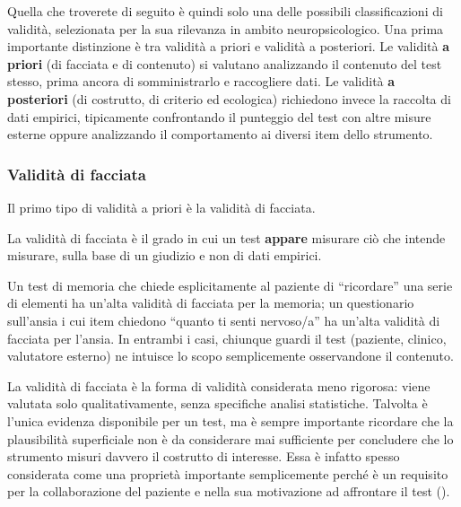 \documentclass[
  italian,
  letterpaper,
  paper=A4,
  headinclude=on,
  footinclude=on,
  12pt]{scrbook}
\begin{document}
Quella che troverete di seguito è quindi solo una delle possibili
classificazioni di validità, selezionata per la sua rilevanza in ambito
neuropsicologico. Una prima importante distinzione è tra validità a
priori e validità a posteriori. Le validità \textbf{a priori} (di
facciata e di contenuto) si valutano analizzando il contenuto del test
stesso, prima ancora di somministrarlo e raccogliere dati. Le validità
\textbf{a posteriori} (di costrutto, di criterio ed ecologica)
richiedono invece la raccolta di dati empirici, tipicamente confrontando
il punteggio del test con altre misure esterne oppure analizzando il
comportamento ai diversi item dello strumento.

\subsubsection{Validità di facciata}\label{validituxe0-di-facciata}

Il primo tipo di validità a priori è la validità di facciata.

\begin{tcolorbox}[enhanced jigsaw, left=2mm, colbacktitle=quarto-callout-note-color!10!white, bottomrule=.15mm, opacityback=0, coltitle=black, colframe=quarto-callout-note-color-frame, opacitybacktitle=0.6, leftrule=.75mm, colback=white, toprule=.15mm, title=\textcolor{quarto-callout-note-color}{\faInfo}\hspace{0.5em}{Definizione}, titlerule=0mm, arc=.35mm, breakable, rightrule=.15mm, bottomtitle=1mm, toptitle=1mm]

La validità di facciata è il grado in cui un test \textbf{appare}
misurare ciò che intende misurare, sulla base di un giudizio e non di
dati empirici.

\end{tcolorbox}

Un test di memoria che chiede esplicitamente al paziente di
``ricordare'' una serie di elementi ha un'alta validità di facciata per
la memoria; un questionario sull'ansia i cui item chiedono ``quanto ti
senti nervoso/a'' ha un'alta validità di facciata per l'ansia. In
entrambi i casi, chiunque guardi il test (paziente, clinico, valutatore
esterno) ne intuisce lo scopo semplicemente osservandone il contenuto.

La validità di facciata è la forma di validità considerata meno
rigorosa: viene valutata solo qualitativamente, senza specifiche analisi
statistiche. Talvolta è l'unica evidenza disponibile per un test, ma è
sempre importante ricordare che la plausibilità superficiale non è da
considerare mai sufficiente per concludere che lo strumento misuri
davvero il costrutto di interesse. Essa è infatto spesso considerata
come una proprietà importante semplicemente perché è un requisito per la
collaborazione del paziente e nella sua motivazione ad affrontare il
test (\cite{slick2006psychometrics}).
\end{document}
